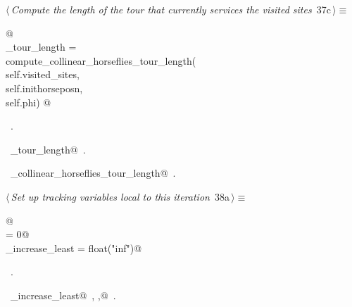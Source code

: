 \documentclass[11.5pt]{report}
\begin{document}
\begin{flushleft} \small\label{scrap34}\raggedright\small
{} $\langle\,${\itshape Compute the length of the tour that currently services the visited sites}\nobreak\ {\footnotesize {37c}}$\,\rangle\equiv$
\vspace{-1ex}
\begin{list}{}{} \item
\mbox{}\verb@   @\\
\mbox{}\verb@current_tour_length    = \@\\
\mbox{}\verb@         compute_collinear_horseflies_tour_length(\@\\
\mbox{}\verb@                    self.visited_sites,\@\\
\mbox{}\verb@                    self.inithorseposn,\@\\
\mbox{}\verb@                    self.phi) @\\
\mbox{}\verb@@{\NWsep}
\end{list}
\vspace{-1.5ex}
\footnotesize
\begin{list}{}{\setlength{\itemsep}{-\parsep}\setlength{\itemindent}{-\leftmargin}}
\item \NWtxtMacroRefIn\ .
\item \NWtxtIdentsDefed\nobreak\  \verb@current_tour_length@\nobreak\ .\item \NWtxtIdentsUsed\nobreak\  \verb@compute_collinear_horseflies_tour_length@\nobreak\ .
\item{}
\end{list}
\vspace{4ex}
\end{flushleft}
\newchunk 
\begin{flushleft} \small\label{scrap35}\raggedright\small
{} $\langle\,${\itshape Set up tracking variables local to this iteration}\nobreak\ {\footnotesize {38a}}$\,\rangle\equiv$
\vspace{-1ex}
\begin{list}{}{} \item
\mbox{}\verb@   @\\
\mbox{}\verb@ibest                = 0@\\
\mbox{}\verb@delta_increase_least = float("inf")@\\
\mbox{}\verb@@{\NWsep}
\end{list}
\vspace{-1.5ex}
\footnotesize
\begin{list}{}{\setlength{\itemsep}{-\parsep}\setlength{\itemindent}{-\leftmargin}}
\item \NWtxtMacroRefIn\ .
\item \NWtxtIdentsDefed\nobreak\  \verb@delta_increase_least@\nobreak\ , \verb@ibest,@\nobreak\ .
\item{}
\end{list}
\vspace{4ex}
\end{flushleft}
\end{document}
